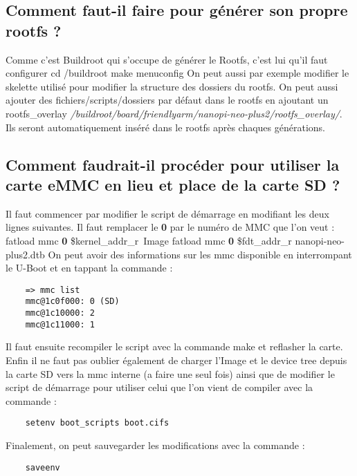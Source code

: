 \documentclass{ReportTemplate}
\begin{document}
\subsection{Comment faut-il faire pour générer son propre rootfs ?}
Comme c'est Buildroot qui s'occupe de générer le Rootfs, c'est lui qu'il faut configurer \newline
cd /buildroot \newline
make menuconfig \newline
On peut aussi par exemple modifier le skelette utilisé pour modifier la structure des dossiers du rootfs.
On peut aussi ajouter des fichiers/scripts/dossiers par défaut dans le rootfs en ajoutant un rootfs\_overlay \textit{/buildroot/board/friendlyarm/nanopi-neo-plus2/rootfs\_overlay/}. 
Ils seront automatiquement inséré dans le rootfs après chaques générations.

\subsection{Comment faudrait-il procéder pour utiliser la carte eMMC en lieu et place de la carte SD ?}
Il faut commencer par modifier le script de démarrage en modifiant les deux lignes suivantes. Il faut remplacer le \textbf{0} par le numéro de MMC que l'on veut : \newline
 fatload mmc \textbf{0} \$kernel\_addr\_r\ Image \newline
 fatload mmc \textbf{0} \$fdt\_addr\_r nanopi-neo-plus2.dtb \newline
On peut avoir des informations sur les mmc disponible en interrompant le U-Boot et en tappant la commande : \newline
\begin{verbatim}
    => mmc list
    mmc@1c0f000: 0 (SD) 
    mmc@1c10000: 2 
    mmc@1c11000: 1 
\end{verbatim}

Il faut ensuite recompiler le script avec la commande make et reflasher la carte. Enfin il ne faut pas oublier également de charger l'Image et le device tree depuis la carte SD vers la mmc interne (a faire une seul fois) ainsi que de modifier le script de démarrage pour utiliser celui que l'on vient de compiler avec la commande : \newline
\begin{verbatim}
    setenv boot_scripts boot.cifs
\end{verbatim}
 
Finalement, on peut sauvegarder les modifications avec la commande :\newline
\begin{verbatim}
    saveenv
\end{verbatim}
\end{document}
